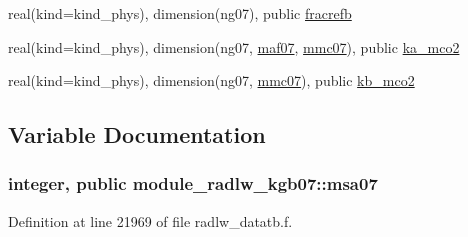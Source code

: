 \begin{DoxyCompactItemize}
\item 
real(kind=kind\+\_\+phys), dimension(ng07), public \hyperlink{group__module__radlw__main_gaa16eb60406e5a298e380b55af528791a}{fracrefb}
\item 
real(kind=kind\+\_\+phys), dimension(ng07, \hyperlink{group__module__radlw__main_ga21ac454fe21fb07ee555b4106121b2ae}{maf07}, \hyperlink{group__module__radlw__main_ga2d176bec938d9fdcc2369fda91308702}{mmc07}), public \hyperlink{group__module__radlw__main_ga3fdad494f3d3fcf9306da6a81d97bd43}{ka\+\_\+mco2}
\item 
real(kind=kind\+\_\+phys), dimension(ng07, \hyperlink{group__module__radlw__main_ga2d176bec938d9fdcc2369fda91308702}{mmc07}), public \hyperlink{group__module__radlw__main_ga2dcfbe76332d559cda48c7ba065ab349}{kb\+\_\+mco2}
\end{DoxyCompactItemize}


\subsection{Variable Documentation}
\subsubsection[{\texorpdfstring{msa07}{msa07}}]{\setlength{\rightskip}{0pt plus 5cm}integer, public module\+\_\+radlw\+\_\+kgb07\+::msa07}\hypertarget{namespacemodule__radlw__kgb07_a0acb84a6b261fc00f1765707844c32f2}{}\label{namespacemodule__radlw__kgb07_a0acb84a6b261fc00f1765707844c32f2}


Definition at line 21969 of file radlw\+\_\+datatb.\+f.

